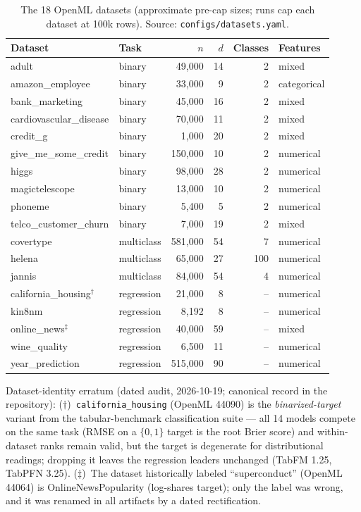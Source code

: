 \documentclass[11pt]{article}
\begin{document}
\begin{table}[t]
\centering
\caption{The 18 OpenML datasets (approximate pre-cap sizes; runs cap each
dataset at 100k rows). Source: \texttt{configs/\allowbreak datasets.\allowbreak yaml}.}
\label{tab:datasets}
\small
\begin{tabular}{llrrrl}
\toprule
Dataset & Task & $n$ & $d$ & Classes & Features \\
\midrule
adult                    & binary & 49{,}000 & 14 & 2 & mixed \\
amazon\_employee         & binary & 33{,}000 & 9  & 2 & categorical \\
bank\_marketing          & binary & 45{,}000 & 16 & 2 & mixed \\
cardiovascular\_disease  & binary & 70{,}000 & 11 & 2 & mixed \\
credit\_g                & binary & 1{,}000  & 20 & 2 & mixed \\
give\_me\_some\_credit    & binary & 150{,}000 & 10 & 2 & numerical \\
higgs                    & binary & 98{,}000 & 28 & 2 & numerical \\
magictelescope           & binary & 13{,}000 & 10 & 2 & numerical \\
phoneme                  & binary & 5{,}400  & 5  & 2 & numerical \\
telco\_customer\_churn    & binary & 7{,}000  & 19 & 2 & mixed \\
covertype                & multiclass & 581{,}000 & 54 & 7 & numerical \\
helena                   & multiclass & 65{,}000 & 27 & 100 & numerical \\
jannis                   & multiclass & 84{,}000 & 54 & 4 & numerical \\
california\_housing$^{\dagger}$ & regression & 21{,}000 & 8  & -- & numerical \\
kin8nm                   & regression & 8{,}192  & 8  & -- & numerical \\
online\_news$^{\ddagger}$ & regression & 40{,}000 & 59 & -- & mixed \\
wine\_quality            & regression & 6{,}500  & 11 & -- & numerical \\
year\_prediction         & regression & 515{,}000 & 90 & -- & numerical \\
\bottomrule
\end{tabular}

\smallskip
\raggedright\footnotesize Dataset-identity erratum (dated audit,
2026-10-19; canonical record in the repository):
($\dagger$)~\texttt{california\_\allowbreak housing} (OpenML 44090) is the
\emph{binarized-target} variant from the tabular-benchmark
classification suite --- all 14 models compete on the same task (RMSE
on a $\{0,1\}$ target is the root Brier score) and within-dataset
ranks remain valid, but the target is degenerate for distributional
readings; dropping it leaves the regression leaders unchanged (TabFM
1.25, TabPFN 3.25). ($\ddagger$)~The dataset historically labeled
``superconduct'' (OpenML 44064) is OnlineNewsPopularity
(log-shares target); only the label was wrong, and it was renamed in
all artifacts by a dated rectification.
\end{table}
\end{document}
